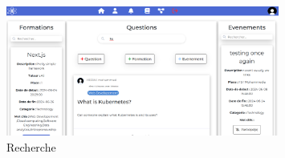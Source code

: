 \documentclass{article}
\begin{document}
                    \begin{figure}[h!]
                        \centering
                        \includegraphics[width=0.8\textwidth]{assets/webSite/search.png}
                        \caption{Recherche}
                    \end{figure}
                    \FloatBarrier 
\end{document}
